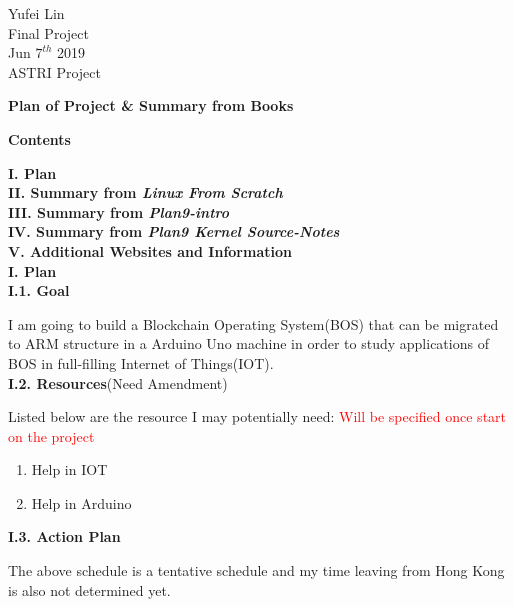 \documentclass[a4paper,12pt]{report}
\begin{document}
\noindent
Yufei Lin\\

\noindent
Final Project\\

\noindent
Jun \(7^{th}\) 2019\\

\noindent
ASTRI Project

\begin{center}
\textbf{Plan of Project \& Summary from Books}
\end{center}

\begin{center}
\textbf{Contents}
\end{center}

\noindent
\textbf{I. Plan}\\

\noindent
\textbf{II. Summary from \textit{Linux From Scratch}}\\

\noindent
\textbf{III. Summary from \textit{Plan9-intro}}\\

\noindent
\textbf{IV. Summary from \textit{Plan9 Kernel Source-Notes}}\\

\noindent
\textbf{V. Additional Websites and Information}\\



\pagebreak
\noindent
\textbf{I. Plan}\\

\noindent
\textbf{I.1. Goal}

\noindent
I am going to build a Blockchain Operating System(BOS) that can be migrated to ARM structure in a Arduino Uno machine in order to study applications of BOS in full-filling Internet of Things(IOT). \\

\noindent
\textbf{I.2. Resources}(Need Amendment)

\noindent
Listed below are the resource I may potentially need: \textcolor{red}{Will be specified once start on the project}

\begin{enumerate}
\item Help in IOT 
\item Help in Arduino
\end{enumerate}

\noindent
\textbf{I.3. Action Plan}

\noindent
The above schedule is a tentative schedule and my time leaving from Hong Kong is also not determined yet. 
\end{document}
